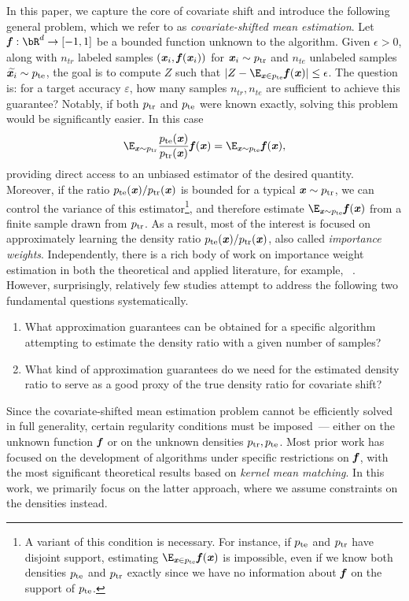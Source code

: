 In this paper, we capture the core of covariate shift and introduce the following general problem, which we refer to as \emph{covariate-shifted mean estimation}. Let $\ff: \bR^d \to [-1,1]$ be a bounded function unknown to the algorithm. Given $\epsilon>0$,  along with $n_{tr}$ labeled samples $(\boldsymbol{\mathit{x}}_i,\boldsymbol{\mathit{f}}(\boldsymbol{\mathit{x}}_i))$ for $\boldsymbol{\mathit{x}}_i\sim p_{\mathrm{tr}}$ and $n_{te}$ unlabeled samples $\widetilde{\boldsymbol{\mathit{x}}_i}\sim p_{\mathrm{te}}$, the goal is to compute $Z$ such that $|Z-\E_{\xx\in \pte}\ff(\xx)|\leq \epsilon$. The question is: for a target accuracy $\varepsilon$, how many samples $n_{tr}, n_{te}$ are sufficient to achieve this guarantee? Notably, if both $p_{\mathrm{tr}}$ and $p_{\mathrm{te}}$ were known exactly, solving this problem would be significantly easier. In this case \begin{equation*}
    \E_{\xx\sim \ptr} \frac{\pte(\xx)}{\ptr(\xx)}\ff(\xx) = \E_{\xx\sim \pte}\ff(\xx),
\end{equation*}
providing direct access to an unbiased estimator of the desired quantity. Moreover, if the ratio $p_{\mathrm{te}}(\boldsymbol{\mathit{x}})/p_{\mathrm{tr}}(\boldsymbol{\mathit{x}})$ is bounded for a typical $\boldsymbol{\mathit{x}} \sim p_{\mathrm{tr}}$, we can control the variance of this estimator\footnote{A variant of this condition is necessary. For instance, if $p_{\mathrm{te}}$ and $p_{\mathrm{tr}}$ have disjoint support, estimating $\E_{\xx\in \pte}\ff(\xx)$ is impossible, even if we know both densities $p_{\mathrm{te}}$ and $p_{\mathrm{tr}}$ exactly since we have no information about $\boldsymbol{\mathit{f}}$ on the support of $p_{\mathrm{te}}$.}, and therefore estimate $\E_{\xx \sim \pte} \ff(\xx)$ from a finite sample drawn from $p_{\mathrm{tr}}$. As a result, most of the interest is focused on approximately learning the density ratio $p_{\mathrm{te}}(\boldsymbol{\mathit{x}})/p_{\mathrm{tr}}(\boldsymbol{\mathit{x}})$, also called {\it importance weights}. Independently, there is a rich body of work on importance weight estimation in both the theoretical and applied literature, for example, ~\cite{CYM10,wen2015correcting,hachiya2012importance,gopalan2022multicalibrated,sugiyama2012density}. However, surprisingly, relatively few studies attempt to address the following two fundamental questions systematically.
\begin{enumerate}
    \item What approximation guarantees can be obtained for a specific algorithm attempting to estimate the density ratio with a given number of samples?
    \item What kind of approximation guarantees do we need for the estimated density ratio to serve as a good proxy of the true density ratio for covariate shift?
\end{enumerate}

Since the covariate-shifted mean estimation problem cannot be efficiently solved in full generality, certain regularity conditions must be imposed~--- either on the unknown function $\boldsymbol{\mathit{f}}$ or on the unknown densities $p_{\mathrm{tr}}, p_{\mathrm{te}}$. Most prior work has focused on the development of algorithms under specific restrictions on $\boldsymbol{\mathit{f}}$, 
with the most significant theoretical results based on \emph{kernel mean matching}. In this work, we primarily focus on the latter approach, where we assume  constraints on the densities instead.




